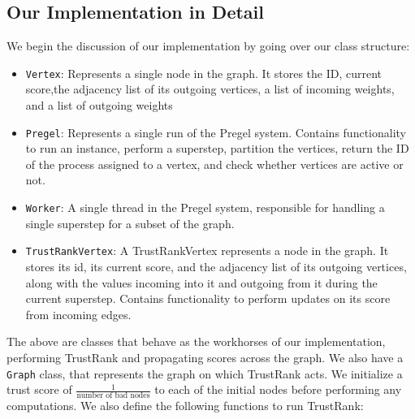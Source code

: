 \documentclass[conference]{IEEEtran}
\begin{document}
\subsection{Our Implementation in Detail}
We begin the discussion of our implementation by going over our class structure:
\begin{itemize}
    \item \verb|Vertex|: Represents a single node in the graph. It stores the ID, current score,the adjacency list of its outgoing vertices, a list of incoming weights, and a list of outgoing weights
    \item \verb|Pregel|: Represents a single run of the Pregel system. Contains functionality to run an instance, perform a superstep, partition the vertices, return the ID of the process assigned to a vertex, and check whether vertices are active or not.
    \item \verb|Worker|: A single thread in the Pregel system, responsible for handling a single superstep for a subset of the graph.
    \item \verb|TrustRankVertex|: A TrustRankVertex represents a node in the graph.  It stores its id, its
    current score, and the adjacency list of its outgoing vertices, along with the values incoming into it and outgoing from it during the current superstep. Contains functionality to perform updates on its score from incoming edges.
\end{itemize}
The above are classes that behave as the workhorses of our implementation, performing TrustRank and propagating scores across the graph. We also have a \verb|Graph| class, that represents the graph on which TrustRank acts. We initialize a trust score of $\frac{1}{\text{number of bad nodes}}$ to each of the initial nodes before performing any computations.
We also define the following functions to run TrustRank:
\end{document}
